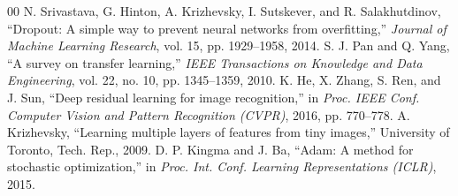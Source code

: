 \documentclass[conference,a4paper]{IEEEtran}
\begin{document}
\begin{thebibliography}{00}
\makeatletter\renewcommand{\@biblabel}[1]{[#1]}\makeatother
{} N. Srivastava, G. Hinton, A. Krizhevsky, I. Sutskever, and R. Salakhutdinov, ``Dropout: A simple way to prevent neural networks from overfitting,'' \textit{Journal of Machine Learning Research}, vol. 15, pp. 1929--1958, 2014.
 S. J. Pan and Q. Yang, ``A survey on transfer learning,'' \textit{IEEE Transactions on Knowledge and Data Engineering}, vol. 22, no. 10, pp. 1345--1359, 2010.
 K. He, X. Zhang, S. Ren, and J. Sun, ``Deep residual learning for image recognition,'' in \textit{Proc. IEEE Conf. Computer Vision and Pattern Recognition (CVPR)}, 2016, pp. 770--778.
 A. Krizhevsky, ``Learning multiple layers of features from tiny images,'' University of Toronto, Tech. Rep., 2009.
 D. P. Kingma and J. Ba, ``Adam: A method for stochastic optimization,'' in \textit{Proc. Int. Conf. Learning Representations (ICLR)}, 2015.
\end{thebibliography}
\end{document}
